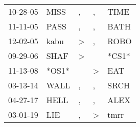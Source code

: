 \begin{supertabular}{lllll}
 10-28-05 &   MISS &             , &             , &   TIME \\
 11-11-05 &   PASS &             , &             , &   BATH \\
 12-02-05 &   kabu &  \textgreater &             , &   ROBO \\
 09-29-06 &   SHAF &  \textgreater &               &  *CS1* \\
 11-13-08 &  *OS1* &               &  \textgreater &    EAT \\
 03-13-14 &   WALL &             , &             , &   SRCH \\
 04-27-17 &   HELL &             , &             , &   ALEX \\
 03-01-19 &    LIE &             , &  \textgreater &   tmrr \\
\end{supertabular}
